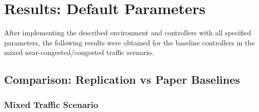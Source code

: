 \section{Results: Default Parameters}


After implementing the described environment and controllers with all specified parameters, the following results were obtained for the
baseline controllers in the mixed near-congested/congested traffic scenario.

\subsection{Comparison: Replication vs Paper Baselines}

\subsubsection{Mixed Traffic Scenario}

